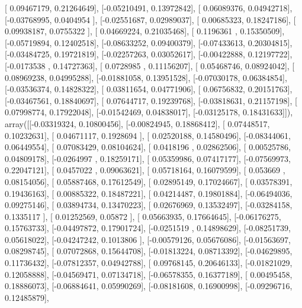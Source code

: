 \documentclass{article}
\begin{document}
       [ 0.09467179,  0.21264649],
       [-0.05210491,  0.13972842],
       [ 0.06089376,  0.04942718],
       [-0.03768995,  0.0404954 ],
       [-0.02551687,  0.02989037],
       [ 0.00685323,  0.18247186],
       [ 0.09938187,  0.0755322 ],
       [ 0.04669224,  0.21035468],
       [ 0.1196361 ,  0.15350509],
       [-0.05719894,  0.12402518],
       [-0.08633252,  0.09400379],
       [-0.07433613,  0.20304815],
       [-0.03484725,  0.19721819],
       [-0.02257263,  0.03052617],
       [-0.00422888,  0.12197722],
       [-0.0173538 ,  0.14727363],
       [ 0.0728985 ,  0.11156207],
       [ 0.05468746,  0.08924042],
       [ 0.08969238,  0.04995288],
       [-0.01881058,  0.13951528],
       [-0.07030178,  0.06384854],
       [-0.03536374,  0.14828322],
       [ 0.03811654,  0.04771906],
       [ 0.06756832,  0.20151763],
       [-0.03467561,  0.18840697],
       [ 0.07644717,  0.19239768],
       [-0.03818631,  0.21157198],
       [ 0.07998774,  0.17922048],
       [-0.01542469,  0.04838017],
       [-0.03125178,  0.18431633]]), array([[-0.03319324,  0.10800456],
       [-0.00824945,  0.18868412],
       [ 0.07448517,  0.10232631],
       [ 0.04671117,  0.1928694 ],
       [ 0.02520188,  0.14580496],
       [-0.08344061,  0.06449554],
       [ 0.07083429,  0.08104624],
       [ 0.0418196 ,  0.02862506],
       [ 0.00525786,  0.04809178],
       [-0.0264997 ,  0.18259171],
       [ 0.05359986,  0.07417177],
       [-0.07569973,  0.22047121],
       [ 0.0457022 ,  0.09063621],
       [ 0.05718164,  0.16079599],
       [ 0.053669  ,  0.08154056],
       [ 0.05887468,  0.17612549],
       [ 0.02895149,  0.17024667],
       [ 0.03578391,  0.19436163],
       [ 0.00885322,  0.18487221],
       [ 0.04214487,  0.19801884],
       [-0.06494036,  0.09275146],
       [ 0.03894734,  0.13470223],
       [ 0.02676969,  0.13532497],
       [-0.03284158,  0.1335117 ],
       [ 0.01252569,  0.05872   ],
       [ 0.05663935,  0.17664645],
       [-0.06176275,  0.15763733],
       [-0.04497872,  0.17901724],
       [-0.0251519 ,  0.14898629],
       [-0.08251739,  0.05618022],
       [-0.04247242,  0.1013806 ],
       [-0.00579126,  0.05676086],
       [-0.01563697,  0.08298745],
       [ 0.07072868,  0.15644708],
       [-0.01813224,  0.08713392],
       [-0.04629895,  0.11736432],
       [-0.07812357,  0.04942788],
       [ 0.09768145,  0.20646133],
       [-0.01821029,  0.12058888],
       [-0.04569471,  0.07134718],
       [-0.06578355,  0.16377189],
       [ 0.00495458,  0.18886073],
       [-0.06884641,  0.05990269],
       [-0.08181608,  0.16900998],
       [-0.09296716,  0.12485879],
\end{document}
